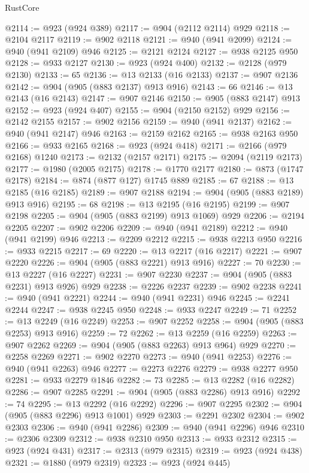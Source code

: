 \begin{lexlean}{RustCore}
\begin{coremodule}
@2114 := @923 (@924 @389)
@2117 := @904 (@2112 @2114) @929
@2118 := @2104 @2117
@2119 := @902 @2118
@2121 := @940 (@941 @2099)
@2124 := @940 (@941 @2109) @946
@2125 := @2121 @2124
@2127 := @938 @2125 @950
@2128 := @933 @2127
@2130 := @923 (@924 @400)
@2132 := @2128 (@979 @2130)
@2133 := 65
@2136 := @13 @2133 (@16 @2133)
@2137 := @907 @2136
@2142 := @904 (@905 (@883 @2137) @913 @916)
@2143 := 66
@2146 := @13 @2143 (@16 @2143)
@2147 := @907 @2146
@2150 := @905 (@883 @2147) @913
@2152 := @923 (@924 @407)
@2155 := @904 (@2150 @2152) @929
@2156 := @2142 @2155
@2157 := @902 @2156
@2159 := @940 (@941 @2137)
@2162 := @940 (@941 @2147) @946
@2163 := @2159 @2162
@2165 := @938 @2163 @950
@2166 := @933 @2165
@2168 := @923 (@924 @418)
@2171 := @2166 (@979 @2168) @1240
@2173 := @2132 (@2157 @2171)
@2175 := @2094 (@2119 @2173)
@2177 := @1980 (@2005 @2175)
@2178 := @1770 @2177
@2180 := @873 (@1747 @2178)
@2184 := @874 (@877 @127) @1745 @889
@2185 := 67
@2188 := @13 @2185 (@16 @2185)
@2189 := @907 @2188
@2194 := @904 (@905 (@883 @2189) @913 @916)
@2195 := 68
@2198 := @13 @2195 (@16 @2195)
@2199 := @907 @2198
@2205 := @904 (@905 (@883 @2199) @913 @1069) @929
@2206 := @2194 @2205
@2207 := @902 @2206
@2209 := @940 (@941 @2189)
@2212 := @940 (@941 @2199) @946
@2213 := @2209 @2212
@2215 := @938 @2213 @950
@2216 := @933 @2215
@2217 := 69
@2220 := @13 @2217 (@16 @2217)
@2221 := @907 @2220
@2226 := @904 (@905 (@883 @2221) @913 @916)
@2227 := 70
@2230 := @13 @2227 (@16 @2227)
@2231 := @907 @2230
@2237 := @904 (@905 (@883 @2231) @913 @926) @929
@2238 := @2226 @2237
@2239 := @902 @2238
@2241 := @940 (@941 @2221)
@2244 := @940 (@941 @2231) @946
@2245 := @2241 @2244
@2247 := @938 @2245 @950
@2248 := @933 @2247
@2249 := 71
@2252 := @13 @2249 (@16 @2249)
@2253 := @907 @2252
@2258 := @904 (@905 (@883 @2253) @913 @916)
@2259 := 72
@2262 := @13 @2259 (@16 @2259)
@2263 := @907 @2262
@2269 := @904 (@905 (@883 @2263) @913 @964) @929
@2270 := @2258 @2269
@2271 := @902 @2270
@2273 := @940 (@941 @2253)
@2276 := @940 (@941 @2263) @946
@2277 := @2273 @2276
@2279 := @938 @2277 @950
@2281 := @933 @2279 @1846
@2282 := 73
@2285 := @13 @2282 (@16 @2282)
@2286 := @907 @2285
@2291 := @904 (@905 (@883 @2286) @913 @916)
@2292 := 74
@2295 := @13 @2292 (@16 @2292)
@2296 := @907 @2295
@2302 := @904 (@905 (@883 @2296) @913 @1001) @929
@2303 := @2291 @2302
@2304 := @902 @2303
@2306 := @940 (@941 @2286)
@2309 := @940 (@941 @2296) @946
@2310 := @2306 @2309
@2312 := @938 @2310 @950
@2313 := @933 @2312
@2315 := @923 (@924 @431)
@2317 := @2313 (@979 @2315)
@2319 := @923 (@924 @438)
@2321 := @1880 (@979 @2319)
@2323 := @923 (@924 @445)

\end{coremodule}
\end{lexlean}
